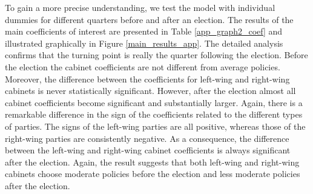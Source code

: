\documentclass[a4paper,12pt]{article}
\begin{document}
To gain a more precise understanding, we test the model with individual dummies for different quarters before and after an election. The results of the main coefficients of interest are presented in Table \ref{app_graph2_coef} and illustrated graphically in Figure \ref{main_results_app}. The detailed analysis confirms that the turning point is really the quarter following the election. Before the election the cabinet coefficients are not different from average policies. Moreover, the difference between the coefficients for left-wing and right-wing cabinets is never statistically significant. However, after the election almost all cabinet coefficients become significant and substantially larger. Again, there is a remarkable difference in the sign of the coefficients related to the different types of parties. The signs of the left-wing parties are all positive, whereas those of the right-wing parties are consistently negative. As a consequence, the difference between the left-wing and right-wing cabinet coefficients is always significant after the election. Again, the result suggests that both left-wing and right-wing cabinets choose moderate policies before the election and less moderate policies after the election.


\end{document}
